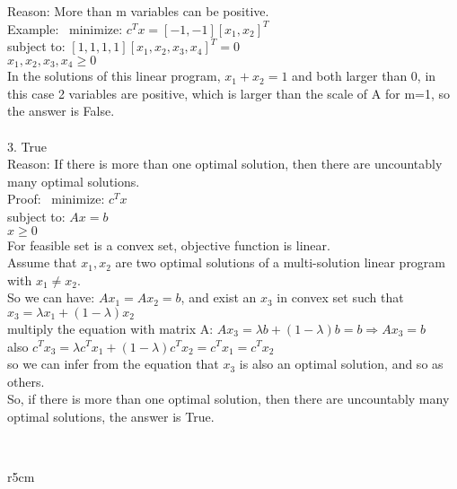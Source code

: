 \documentclass{article}
\begin{document}
{{Reason: More than m variables can be positive.\\
Example: \, minimize: $c^Tx = [-1, -1][x_1, x_2]^T$ \\
\hspace*{60pt}subject to: $[1, 1, 1, 1][x_1, x_2, x_3, x_4]^T = 0$\\
\hspace*{120pt} $x_1, x_2, x_3, x_4 \geq 0$ \\ 
In the solutions of this linear program, $x_1+x_2=1$ and both larger than 0, in this case 2 variables are positive, which is larger than the scale of A for m=1, so the answer is False.\\
~\\ 
3. \quad True \\ 
Reason: If there is more than one optimal solution, then there are uncountably many optimal solutions.\\ 
Proof: \, minimize: $c^Tx$ \\
\hspace*{45pt}subject to: $Ax = b$\\
\hspace*{105pt} $x \geq 0$ \\ 
For feasible set is a convex set, objective function is linear.\\ 
Assume that $x_1, x_2$ are two optimal solutions of a multi-solution linear program with $x_1 \neq x_2$.\\ 
So we can have: $Ax_1 = Ax_2 = b$, and exist an $x_3$ in convex set such that $x_3=\lambda x_1+(1-\lambda)x_2$\\ 
multiply the equation with matrix A: $Ax_3=\lambda b +(1-\lambda)b=b \Rightarrow Ax_3 = b$\\ 
also $c^Tx_3= \lambda c^Tx_1 + (1-\lambda)c^Tx_2=c^Tx_1=c^Tx_2$\\
so we can infer from the equation that $x_3$ is also an optimal solution, and so as others.\\
So, if there is more than one optimal solution, then there are uncountably many optimal solutions, the answer is True.

~\\
\begin{wrapfigure}{r}{5cm}
\end{wrapfigure}
}}
\end{document}
